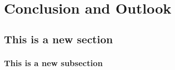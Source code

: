 \chapter{Conclusion and Outlook}
\section{This is a new section}
\subsection{This is a new subsection}
